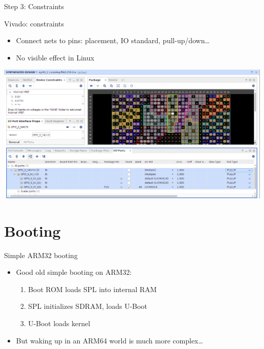 \documentclass[xetex,table]{beamer}
\begin{document}
\begin{frame}[standout]
  Step 3: Constraints
\end{frame}

\begin{frame}{Vivado: constraints}
  \begin{itemize}
  \item Connect nets to pins: placement, IO standard, pull-up/down\dots
  \item No visible effect in Linux
  \end{itemize}

  \center\includegraphics[width=1.0\textwidth]{images/pin-assignment.png}
\end{frame}

\section{Booting}

\begin{frame}{Simple ARM32 booting}
  \begin{itemize}
    \item Good old simple booting on ARM32:
    \begin{enumerate}
    \item Boot ROM loads SPL into internal RAM
    \item SPL initializes SDRAM, loads U-Boot
    \item U-Boot loads kernel
    \end{enumerate}
  \item But waking up in an ARM64 world is much more complex\dots
  \end{itemize}
\end{frame}
\end{document}
